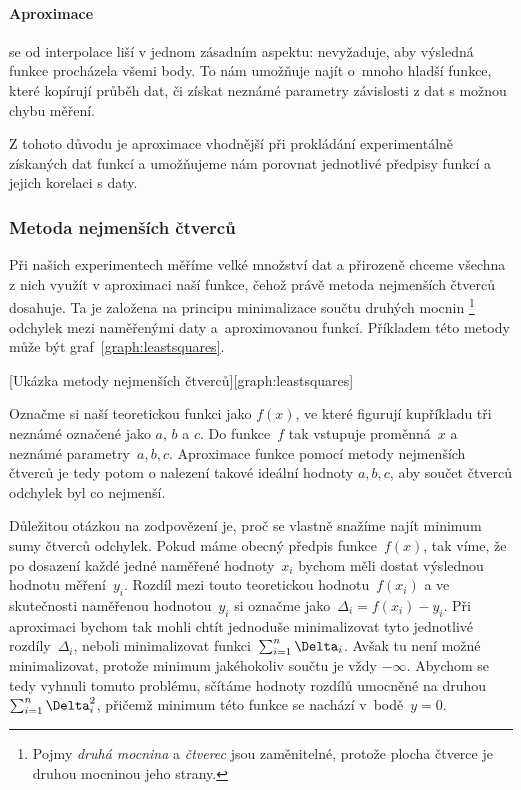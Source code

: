 \paragraph{Aproximace} se od interpolace liší v jednom zásadním aspektu:
nevyžaduje, aby výsledná funkce procházela všemi body. To nám umožňuje najít
o~mnoho hladší funkce, které kopírují průběh dat, či získat neznámé parametry
závislosti z dat s možnou chybu měření. 

Z tohoto důvodu je aproximace vhodnější při prokládání experimentálně získaných
dat funkcí a umožňujeme nám porovnat jednotlivé předpisy funkcí a jejich
korelaci s daty.

\subsubsection{Metoda nejmenších čtverců}
\label{sec:čtverce}
Při našich experimentech měříme velké množství dat a přirozeně chceme všechna z
nich využít v aproximaci naší funkce, čehož právě metoda nejmenších čtverců
dosahuje. Ta je založena na principu minimalizace součtu druhých mocnin%
\footnote{Pojmy \emph{druhá mocnina} a \emph{čtverec} jsou zaměnitelné, protože
plocha čtverce je druhou mocninou jeho strany.} odchylek mezi naměřenými daty
a~aproximovanou funkcí. Příkladem této metody může být
graf~\ref{graph:leastsquares}.

[Ukázka metody nejmenších čtverců][graph:leastsquares]

Označme si naší teoretickou funkci jako $f(x)$, ve které figurují kupříkladu
tři neznámé označené jako $a$, $b$ a $c$. Do funkce~$f$ tak vstupuje
proměnná~$x$ a neznámé parametry~$a,b,c$. Aproximace funkce pomocí metody
nejmenších čtverců je tedy potom o nalezení takové ideální hodnoty $a,b,c$, aby
součet čtverců odchylek byl co nejmenší.

Důležitou otázkou na zodpovězení je, proč se vlastně snažíme najít minimum sumy
čtverců odchylek. Pokud máme obecný předpis funkce~$f(x)$, tak víme, že po
dosazení každé jedné naměřené hodnoty~$x_i$ bychom měli dostat výslednou
hodnotu měření~$y_i$. Rozdíl mezi touto teoretickou hodnotu~$f(x_i)$ a ve
skutečnosti naměřenou hodnotou~$y_i$ si označme jako~$\Delta_i = f(x_i)-y_i$.
Při aproximaci bychom tak mohli chtít jednoduše minimalizovat tyto jednotlivé
rozdíly~$\Delta_i$, neboli minimalizovat funkci~$\nsum \Delta_i$. Avšak tu není
možné minimalizovat, protože minimum jakéhokoliv součtu je vždy $-\infty$.
Abychom se tedy vyhnuli tomuto problému, sčítáme hodnoty rozdílů umocněné na
druhou~$\nsum \Delta_i^2$, přičemž minimum této funkce se nachází
v~bodě~$y=0$.~\cite{praktikum}

